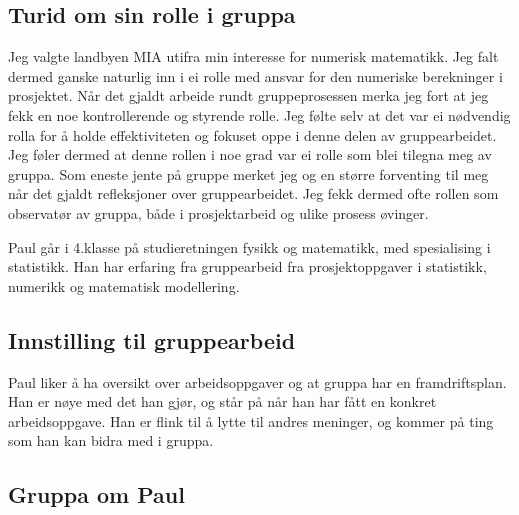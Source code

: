 \subsection*{Turid om sin rolle i gruppa}

Jeg valgte landbyen MIA utifra min interesse for numerisk matematikk. Jeg falt dermed ganske naturlig inn i ei rolle med ansvar for den numeriske berekninger i prosjektet. Når det gjaldt arbeide rundt gruppeprosessen merka jeg fort at jeg fekk en noe kontrollerende og styrende rolle. Jeg følte selv at det var ei nødvendig  rolla for å holde effektiviteten og fokuset oppe i denne delen av gruppearbeidet. Jeg føler dermed at denne rollen i noe grad var ei rolle som blei tilegna meg av gruppa. Som eneste jente på gruppe merket jeg og en større forventing til meg når det gjaldt refleksjoner over gruppearbeidet. Jeg fekk dermed ofte rollen som observatør av gruppa, både i prosjektarbeid og ulike prosess øvinger. 

Paul går i 4.klasse på studieretningen fysikk og matematikk, med spesialising i statistikk. Han har erfaring fra gruppearbeid fra prosjektoppgaver i statistikk, numerikk og matematisk modellering.

\subsection*{Innstilling til gruppearbeid}
Paul liker å ha oversikt over arbeidsoppgaver og at gruppa har en framdriftsplan. Han er nøye med det han gjør, og står på når han har fått en konkret arbeidsoppgave. Han er flink til å lytte til andres meninger, og kommer på ting som han kan bidra med i gruppa.

\subsection*{Gruppa om Paul}

\lipsum[7-8]

